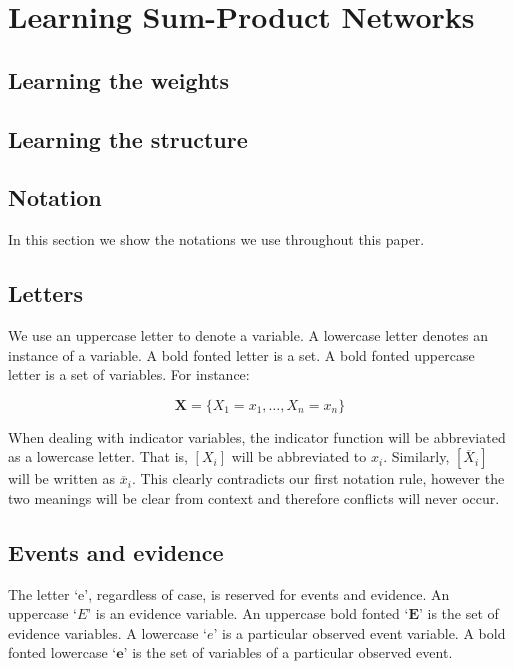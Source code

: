 \documentclass[a4paper,10pt]{article}
\theoremstyle{plain}
\begin{document}
\newpage

\section{Learning Sum-Product Networks}

\subsection{Learning the weights}

\subsection{Learning the structure}

\newpage
\begin{appendices}
\section{Notation}\label{app:not}

In this section we show the notations we use throughout this paper.

\subsection{Letters}

We use an uppercase letter to denote a variable. A lowercase letter denotes an instance of a
variable. A bold fonted letter is a set. A bold fonted uppercase letter is a set of variables. For
instance:

\begin{equation*}
  \mathbf{X}=\{X_1=x_1,\ldots,X_n=x_n\}
\end{equation*}

When dealing with indicator variables, the indicator function will be abbreviated as a lowercase
letter. That is, $[X_i]$ will be abbreviated to $x_i$. Similarly, $[\overline{X}_i]$ will be
written as $\overline{x}_i$. This clearly contradicts our first notation rule, however the two
meanings will be clear from context and therefore conflicts will never occur.

\subsection{Events and evidence}

The letter `e', regardless of case, is reserved for events and evidence. An uppercase `$E$' is an
evidence variable. An uppercase bold fonted `$\mathbf{E}$' is the set of evidence variables. A
lowercase `$e$' is a particular observed event variable. A bold fonted lowercase `$\mathbf{e}$' is
the set of variables of a particular observed event.


\end{appendices}
\end{document}
